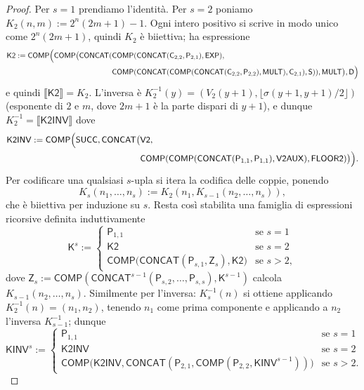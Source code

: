 \begin{proof}
Per $s=1$ prendiamo l'identità. Per $s=2$ poniamo $K_2(n,m):=2^n(2m+1)-1$. Ogni intero positivo si scrive in modo unico come $2^n(2m+1)$, quindi $K_2$ è biiettiva; ha espressione
\[
\begin{aligned}
\mathsf{K2}:=\mathsf{COMP}\Bigl(\mathsf{COMP}\bigl(\mathsf{CONCAT}(&\mathsf{COMP}(\mathsf{CONCAT}(\mathsf C_{2,2},\mathsf P_{2,1}),\mathsf{EXP}),\\
&\mathsf{COMP}(\mathsf{CONCAT}(\mathsf{COMP}(\mathsf{CONCAT}(\mathsf C_{2,2},\mathsf P_{2,2}),\mathsf{MULT}),\mathsf C_{2,1}),\mathsf S)),\mathsf{MULT}\bigr),\mathsf D\Bigr)
\end{aligned}
\]
e quindi $\llbracket\mathsf{K2}\rrbracket=K_2$. L'inversa è $K_2^{-1}(y)=(V_2(y+1),\lfloor\sigma(y+1,y+1)/2\rfloor)$ (esponente di $2$ e $m$, dove $2m+1$ è la parte dispari di $y+1$), e dunque $K_2^{-1}=\llbracket\mathsf{K2INV}\rrbracket$ dove
\[
\begin{aligned}
\mathsf{K2INV}:=\mathsf{COMP}\Bigl(\mathsf{SUCC},\mathsf{CONCAT}\bigl(&\mathsf{V2},\\
&\mathsf{COMP}(\mathsf{COMP}(\mathsf{CONCAT}(\mathsf P_{1,1},\mathsf P_{1,1}),\mathsf{V2AUX}),\mathsf{FLOOR2})\bigr)\Bigr).
\end{aligned}
\]
Per codificare una qualsiasi $s$-upla si itera la codifica delle coppie, ponendo
\[
K_s(n_1,\dots,n_s):=K_2(n_1,K_{s-1}(n_2,\dots,n_s)),
\]
che è biiettiva per induzione su $s$. Resta così stabilita una famiglia di espressioni ricorsive definita induttivamente
\[
\mathsf K^s:=\begin{cases}
\mathsf P_{1,1} & \text{se } s=1\\
\mathsf{K2} & \text{se } s=2\\
\mathsf{COMP}\bigl(\mathsf{CONCAT}(\mathsf P_{s,1},\mathsf Z_s),\mathsf{K2}\bigr) & \text{se } s>2,
\end{cases}
\]
dove $\mathsf Z_s:=\mathsf{COMP}(\mathsf{CONCAT}^{s-1}(\mathsf P_{s,2},\dots,\mathsf P_{s,s}),\mathsf K^{s-1})$ calcola $K_{s-1}(n_2,\dots,n_s)$.
Similmente per l'inversa: $K_s^{-1}(n)$ si ottiene applicando $K_2^{-1}(n)=(n_1,n_2)$, tenendo $n_1$ come prima componente e applicando a $n_2$ l'inversa $K_{s-1}^{-1}$; dunque
\[
\mathsf{KINV}^s:=\begin{cases}
\mathsf P_{1,1} & \text{se } s=1\\
\mathsf{K2INV} & \text{se } s=2\\
\mathsf{COMP}\bigl(\mathsf{K2INV},\mathsf{CONCAT}(\mathsf P_{2,1},\mathsf{COMP}(\mathsf P_{2,2},\mathsf{KINV}^{s-1}))\bigr) & \text{se } s>2.
\end{cases}
\]
\end{proof}


